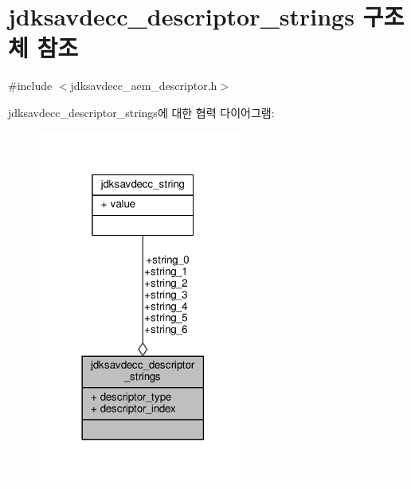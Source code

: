 \hypertarget{structjdksavdecc__descriptor__strings}{}\section{jdksavdecc\+\_\+descriptor\+\_\+strings 구조체 참조}
\label{structjdksavdecc__descriptor__strings}


{\ttfamily \#include $<$jdksavdecc\+\_\+aem\+\_\+descriptor.\+h$>$}



jdksavdecc\+\_\+descriptor\+\_\+strings에 대한 협력 다이어그램\+:
\nopagebreak
\begin{figure}[H]
\begin{center}
\leavevmode
\includegraphics[width=194pt]{structjdksavdecc__descriptor__strings__coll__graph}
\end{center}
\end{figure}
